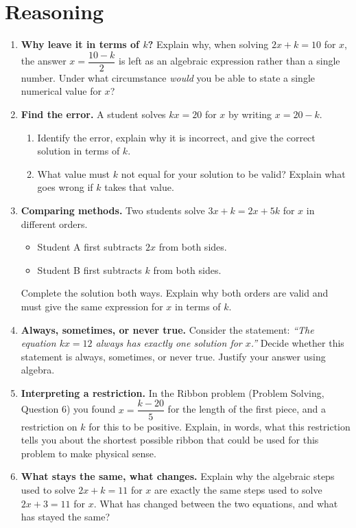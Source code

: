 \documentclass[11pt]{article}
\newcommand{\qspace}{\vspace{1.0cm}}
\begin{document}
\newpage
\section{Reasoning}

\begin{enumerate}
  \item \textbf{Why leave it in terms of $k$?} Explain why, when solving $2x + k = 10$ for $x$, the answer $x = \dfrac{10-k}{2}$ is left as an algebraic expression rather than a single number. Under what circumstance \emph{would} you be able to state a single numerical value for $x$?
  \qspace

  \item \textbf{Find the error.} A student solves $kx = 20$ for $x$ by writing $x = 20 - k$.
  \begin{enumerate}
    \item Identify the error, explain why it is incorrect, and give the correct solution in terms of $k$.
    \item What value must $k$ not equal for your solution to be valid? Explain what goes wrong if $k$ takes that value.
  \end{enumerate}
  \qspace

  \item \textbf{Comparing methods.} Two students solve $3x + k = 2x + 5k$ for $x$ in different orders.
  \begin{itemize}
    \item Student A first subtracts $2x$ from both sides.
    \item Student B first subtracts $k$ from both sides.
  \end{itemize}
  Complete the solution both ways. Explain why both orders are valid and must give the same expression for $x$ in terms of $k$.
  \qspace

  \item \textbf{Always, sometimes, or never true.} Consider the statement: \textit{``The equation $kx = 12$ always has exactly one solution for $x$.''} Decide whether this statement is always, sometimes, or never true. Justify your answer using algebra.
  \qspace

  \item \textbf{Interpreting a restriction.} In the Ribbon problem (Problem Solving, Question 6) you found $x = \dfrac{k-20}{5}$ for the length of the first piece, and a restriction on $k$ for this to be positive. Explain, in words, what this restriction tells you about the shortest possible ribbon that could be used for this problem to make physical sense.
  \qspace

  \item \textbf{What stays the same, what changes.} Explain why the algebraic steps used to solve $2x + k = 11$ for $x$ are exactly the same steps used to solve $2x + 3 = 11$ for $x$. What has changed between the two equations, and what has stayed the same?
  \qspace
\end{enumerate}
\end{document}

